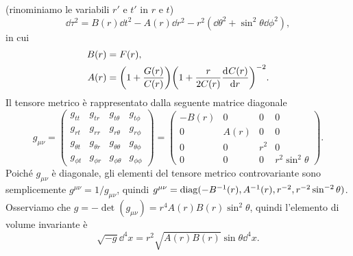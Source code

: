 (rinominiamo le variabili $r'$ e $t'$ in $r$ e $t$)
\begin{equation}
  \label{eq:metrica-standard}
  \dd\tau^{2} = B(r)\dd t^{2} - A(r)\dd r^{2} - r^{2}(\dd\theta^{2} +
  \sin^{2}\theta \dd\phi^{2}),
\end{equation}
in cui
\begin{subequations}
  \begin{align}
    B(r) &= F(r), \\
    A(r) &= \bigg(1 + \frac{G(r)}{C(r)} \bigg) \bigg( 1 + \frac{r}{2C(r)}
    \frac{{\mathop{}\!\mathrm{d}^{}}C(r)}{\mathop{}\!\mathrm{d} {r}^{}} \bigg)^{-2}.
  \end{align}
\end{subequations}
Il tensore metrico è rappresentato dalla seguente matrice diagonale
\begin{equation}
  g_{\mu\nu} =
  \begin{pmatrix}
    g_{tt}       & g_{tr}       & g_{t\theta}      & g_{t\phi}      \\
    g_{rt}       & g_{rr}       & g_{r\theta}      & g_{r\phi}      \\
    g_{\theta t} & g_{\theta r} & g_{\theta\theta} & g_{\theta\phi} \\
    g_{\phi t}   & g_{\phi r}   & g_{\phi\theta}   & g_{\phi\phi}
  \end{pmatrix}
  =
  \begin{pmatrix}
    -B(r) & 0    & 0     & 0 \\
    0     & A(r) & 0     & 0 \\
    0     & 0    & r^{2} & 0 \\
    0     & 0    & 0     & r^{2}\sin^{2}\theta
  \end{pmatrix}.
\end{equation}
Poiché $g_{\mu\nu}$ è diagonale, gli elementi del tensore metrico controvariante
sono semplicemente $g^{\mu\nu} = 1/g_{\mu\nu}$, quindi
$g^{\mu\nu} = \operatorname{diag}(-B^{-1}(r), A^{-1}(r), r^{-2}, r^{-2}\sin^{-2}\theta)$.
Osserviamo che $g = -\det(g_{\mu\nu}) = r^{4}A(r)B(r)\sin^{2}\theta$, quindi
l'elemento di volume invariante è
\begin{equation}
  \sqrt{-g} \dd^{4} x = r^{2}\sqrt{A(r) B(r)} \sin\theta \dd^{4} x.
\end{equation}

